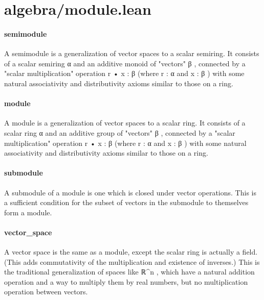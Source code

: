 \documentclass{article}
\begin{document}
\section{algebra/module.lean}\paragraph{semimodule}
\par
A semimodule is a generalization of vector spaces to a scalar semiring.
It consists of a scalar semiring 
\colorbox[RGB]{253,246,227}{{{{\color[RGB]{101, 123, 131} α }}}} and an additive monoid of "vectors" 
\colorbox[RGB]{253,246,227}{{{{\color[RGB]{101, 123, 131} β }}}},
connected by a "scalar multiplication" operation 
\colorbox[RGB]{253,246,227}{{{{\color[RGB]{101, 123, 131} r • x : β }}}}(where 
\colorbox[RGB]{253,246,227}{{{{\color[RGB]{101, 123, 131} r : α }}}} and 
\colorbox[RGB]{253,246,227}{{{{\color[RGB]{101, 123, 131} x : β }}}}) with some natural associativity and
distributivity axioms similar to those on a ring.
\paragraph{module}
\par
A module is a generalization of vector spaces to a scalar ring.
It consists of a scalar ring 
\colorbox[RGB]{253,246,227}{{{{\color[RGB]{101, 123, 131} α }}}} and an additive group of "vectors" 
\colorbox[RGB]{253,246,227}{{{{\color[RGB]{101, 123, 131} β }}}},
connected by a "scalar multiplication" operation 
\colorbox[RGB]{253,246,227}{{{{\color[RGB]{101, 123, 131} r • x : β }}}}(where 
\colorbox[RGB]{253,246,227}{{{{\color[RGB]{101, 123, 131} r : α }}}} and 
\colorbox[RGB]{253,246,227}{{{{\color[RGB]{101, 123, 131} x : β }}}}) with some natural associativity and
distributivity axioms similar to those on a ring.
\paragraph{submodule}
\par
A submodule of a module is one which is closed under vector operations.
This is a sufficient condition for the subset of vectors in the submodule
to themselves form a module.
\paragraph{vector\_space}
\par
A vector space is the same as a module, except the scalar ring is actually
a field. (This adds commutativity of the multiplication and existence of inverses.)
This is the traditional generalization of spaces like 
\colorbox[RGB]{253,246,227}{{{{\color[RGB]{101, 123, 131} ℝ\textasciicircum{}n }}}}, which have a natural
addition operation and a way to multiply them by real numbers, but no multiplication
operation between vectors.
\end{document}
